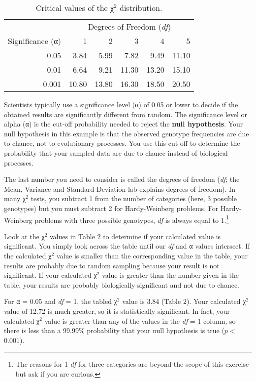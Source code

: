 \documentclass[12pt]{exam}
\begin{document}
\begin{questions}
\begin{table}[h!]
	\begin{center}
	\caption{Critical values of the χ$^2$ distribution.}
	\begin{tabular}{rrrrrr}
	\toprule
		&	\multicolumn{5}{c}{Degrees of Freedom (\textit{df})} \\ \cmidrule{2-6}
	Significance (α)	&	1	&	2	&	3	&	4	&	5 \\
	\midrule
	0.05	&	3.84	&	5.99	&	7.82	&	9.49	&	11.10 \\
	0.01	&	6.64	&	9.21	&	11.30 &	13.20 &	15.10 \\
	0.001 &	10.80 &	13.80 &	16.30 &	18.50 &	20.50 \\
	\bottomrule
	\end{tabular}
	\end{center}
\end{table}

Scientists typically use a significance level (α) of 0.05 or lower to decide if the obtained results are significantly different from random. The significance level or alpha (α) is the cut-off probability needed to reject the \textbf{null hypothesis}. Your null hypothesis in this example is that the observed genotype frequencies are due to chance, not to evolutionary processes. You use this cut off to determine the probability that your sampled data are due to chance instead of biological processes. 

The last number you need to consider is called the degrees of freedom (\textit{df}; the Mean, Variance and Standard Deviation lab explains degrees of freedom). In many χ$^2$ tests, you subtract 1 from the number of categories (here, 3 possible genotypes) but you must subtract 2 for Hardy-Weinberg problems. For Hardy-Weinberg problems with three possible genotypes, \textit{df} is always equal to 1.\footnote{The reasons for 1 \textit{df} for three categories are beyond the scope of this exercise but ask if you are curious.}

Look at the χ$^2$ values in Table 2 to determine if your calculated value is significant. You simply look across the table until our \textit{df} and α values intersect. If the calculated χ$^2$ value is smaller than the corresponding value in the table, your results are probably due to random sampling because your result is not significant. If your calculated χ$^2$ value is greater than the number given in the table, your results are probably biologically significant and not due to chance. 

For α = 0.05 and \textit{df} = 1, the tabled χ$^2$ value is 3.84 (Table 2). Your calculated χ$^2$ value of 12.72 is much greater, so it is statistically significant. In fact, your calculated χ$^2$ value is greater than any of the values in the \textit{df} = 1 column, so there is less than a 99.99\% probability that your null hypothesis is true ($p <$ 0.001). 


\end{questions}
\end{document}

